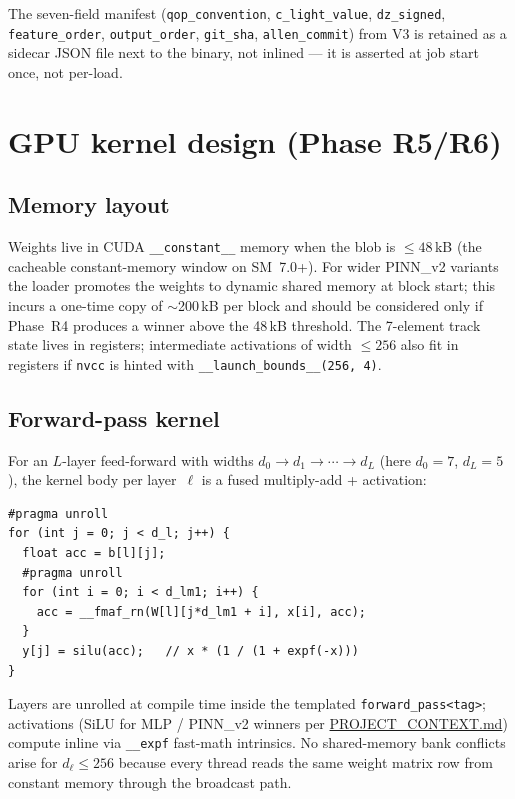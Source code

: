 \documentclass[11pt,a4paper]{article}
\newcommand{\code}[1]{\texttt{#1}}
\begin{document}
The seven-field manifest (\code{qop\_convention}, \code{c\_light\_value},
\code{dz\_signed}, \code{feature\_order}, \code{output\_order},
\code{git\_sha}, \code{allen\_commit}) from V3 is retained as a sidecar
JSON file next to the binary, not inlined --- it is asserted at job start
once, not per-load.

\section{GPU kernel design (Phase R5/R6)}
\label{sec:kernel}

\subsection{Memory layout}
\label{sec:kernel-memory}

Weights live in CUDA \code{\_\_constant\_\_} memory when the blob is
$\le 48$\,kB (the cacheable constant-memory window on SM~7.0+). For wider
PINN\_v2 variants the loader promotes the weights to dynamic shared memory
at block start; this incurs a one-time copy of $\sim$200\,kB per block and
should be considered only if Phase~R4 produces a winner above the 48\,kB
threshold. The 7-element track state lives in registers; intermediate
activations of width $\le 256$ also fit in registers if \code{nvcc} is
hinted with \code{\_\_launch\_bounds\_\_(256, 4)}.

\subsection{Forward-pass kernel}
\label{sec:kernel-forward}

For an $L$-layer feed-forward with widths
$d_0 \to d_1 \to \cdots \to d_L$ (here $d_0 = 7$, $d_L = 5$), the kernel
body per layer~$\ell$ is a fused multiply-add + activation:

\begin{verbatim}
#pragma unroll
for (int j = 0; j < d_l; j++) {
  float acc = b[l][j];
  #pragma unroll
  for (int i = 0; i < d_lm1; i++) {
    acc = __fmaf_rn(W[l][j*d_lm1 + i], x[i], acc);
  }
  y[j] = silu(acc);   // x * (1 / (1 + expf(-x)))
}
\end{verbatim}

Layers are unrolled at compile time inside the templated
\code{forward\_pass<tag>}; activations (SiLU for MLP / PINN\_v2 winners
per \href{run:../../PROJECT_CONTEXT.md}{PROJECT\_CONTEXT.md}) compute
inline via \code{\_\_expf} fast-math intrinsics. No shared-memory bank
conflicts arise for $d_\ell \le 256$ because every thread reads the same
weight matrix row from constant memory through the broadcast path.
\end{document}
